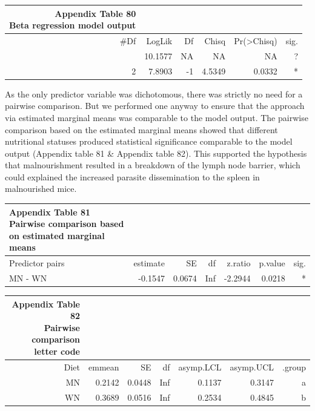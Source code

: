 \documentclass[
  12pt,
  letterpaper,
]{article}
\begin{document}
\begin{longtable}{rrrrrr}
\caption*{
{\large \textbf{Appendix Table 80}} \\ 
{\small \textbf{Beta regression model output}}
} \\ 
\toprule
\#Df & LogLik & Df & Chisq & Pr(>Chisq) & sig. \\ 
\midrule\addlinespace[2.5pt]
3 & 10.1577 & NA & NA & NA & ? \\ 
2 & 7.8903 & -1 & 4.5349 & 0.0332 & * \\ 
\bottomrule
\end{longtable}

As the only predictor variable was dichotomous, there was strictly no need for a pairwise comparison. But we performed one anyway to ensure that the approach via estimated marginal means was comparable to the model output. The pairwise comparison based on the estimated marginal means showed that different nutritional statuses produced statistical significance comparable to the model output (Appendix table 81 \& Appendix table 82). This supported the hypothesis that malnourishment resulted in a breakdown of the lymph node barrier, which could explained the increased parasite dissemination to the spleen in malnourished mice.

\begin{longtable}{l|rrrrrr}
\caption*{
{\large \textbf{Appendix Table 81}} \\ 
{\small \textbf{Pairwise comparison based on estimated marginal means}}
} \\ 
\toprule
\multicolumn{1}{l}{Predictor pairs} & estimate & SE & df & z.ratio & p.value & sig. \\ 
\midrule\addlinespace[2.5pt]
MN - WN & -0.1547 & 0.0674 & Inf & -2.2944 & 0.0218 & * \\ 
\bottomrule
\end{longtable}

\begin{longtable}{rrrrrrr}
\caption*{
{\large \textbf{Appendix Table 82}} \\ 
{\small \textbf{Pairwise comparison letter code}}
} \\ 
\toprule
Diet & emmean & SE & df & asymp.LCL & asymp.UCL & .group \\ 
\midrule\addlinespace[2.5pt]
MN & 0.2142 & 0.0448 & Inf & 0.1137 & 0.3147 &  a  \\ 
WN & 0.3689 & 0.0516 & Inf & 0.2534 & 0.4845 &   b \\ 
\bottomrule
\end{longtable}
\end{document}

